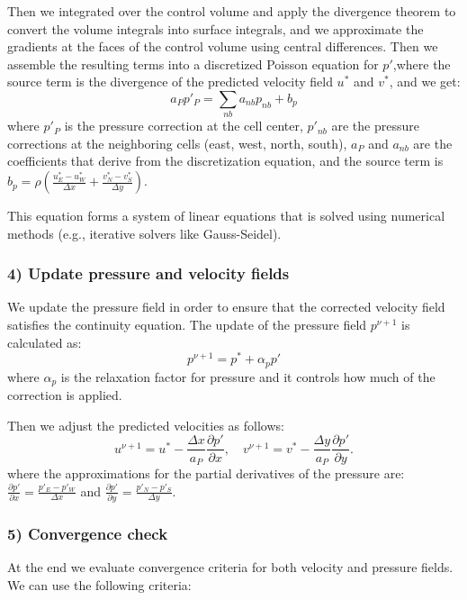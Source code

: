 \documentclass{article}
\begin{document}
Then we integrated over the control volume and apply the divergence theorem to convert the volume integrals into surface integrals, and we approximate the gradients at the faces of the control volume using central differences.
Then we assemble the  resulting terms into a discretized Poisson equation for $p'$,where the source term is the divergence of the predicted velocity field $u^*$ and $v^*$, and we get:
\begin{equation}
  a_P p'_P = \sum_{nb} a_{nb} p_{nb} + b_p
\end{equation} 
where $p'_P$ is the pressure correction at the cell center, $p'_{nb}$ are the pressure corrections at the neighboring cells (east, west, north, south), $a_P$ and $a_{nb}$ are the coefficients that derive from the discretization equation, and the source term is $b_p = \rho \left( \frac{u_E^* - u_W^*}{\Delta x} + \frac{v_N^* - v_S^*}{\Delta y} \right)$. 

This equation forms a system of linear equations that is solved using numerical methods (e.g., iterative solvers like Gauss-Seidel).


\subsubsection*{4) Update pressure and velocity fields}
We update the pressure field in order to ensure that the corrected velocity field satisfies the continuity equation. 
The update of the pressure field $p^{\nu +1}$ is calculated as:
\begin{equation}
  p^{\nu+1} = p^* + \alpha_p p'
\end{equation}
where $\alpha_p$ is the relaxation factor for pressure and it controls how much of the correction is applied.

Then we adjust the predicted velocities as follows:
\begin{equation}
  u^{\nu+1} = u^* - \frac{\Delta x}{a_P} \frac{\partial p'}{\partial x}, \quad v^{\nu+1} = v^* - \frac{\Delta y}{a_P} \frac{\partial p'}{\partial y}.
  \end{equation}
where the approximations for the partial derivatives of the pressure are: $\frac{\partial p'}{\partial x} = \frac{p'_{E} - p'_{W}}{\Delta x}$ and $\frac{\partial p'}{\partial y} = \frac{p'_{N} - p'_{S}}{\Delta y}$.

\subsubsection*{5) Convergence check}
At the end we evaluate convergence criteria for both velocity and pressure fields. We can use the following criteria:
\end{document}
